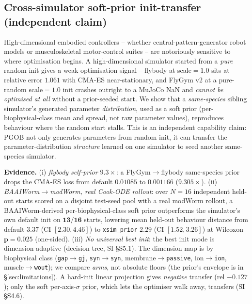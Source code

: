 \documentclass[11pt]{article}
\begin{document}
\subsection{Cross-simulator soft-prior init-transfer (independent claim)}
\label{sec:init_transfer}

High-dimensional embodied controllers -- whether central-pattern-generator robot models \citep{ijspeert2007salamander} or musculoskeletal motor-control suites \citep{caggiano2022myosuite} -- are notoriously sensitive to where optimisation begins. A high-dimensional simulator started from a \emph{pure} random init gives a weak optimisation signal -- flybody at scale${=}1.0$ sits at relative error $1.061$ with CMA-ES near-stationary, and FlyGym v2 at a pure-random scale${=}1.0$ init crashes outright to a MuJoCo NaN and \emph{cannot be optimised at all} without a prior-seeded start. We show that a \emph{same-species} sibling simulator's generated parameter \emph{distribution}, used as a soft prior (per-biophysical-class mean and spread, not raw parameter values), reproduces behaviour where the random start stalls. This is an independent capability claim: PGOB not only generates parameters from random init, it can transfer the parameter-distribution \emph{structure} learned on one simulator to seed another same-species simulator.

\textbf{Evidence.} (i) \emph{flybody self-prior $9.3\times$}: a FlyGym$\to$flybody same-species prior drops the CMA-ES loss from default $0.01085$ to $0.001166$ ($9.305\times$). (ii) \emph{BAAIWorm$\to$modWorm, real Cook-ODE rollout}: over $N{=}16$ independent held-out starts scored on a disjoint test-seed pool with a real modWorm rollout, a BAAIWorm-derived per-biophysical-class soft prior outperforms the simulator's own default init on $\mathbf{13/16}$ starts, lowering mean held-out behaviour distance from default $\mathbf{3.37}$ (CI $[2.30,4.46]$) to \texttt{xsim\_prior} $\mathbf{2.29}$ (CI $[1.52,3.26]$) at Wilcoxon $\mathbf{p{=}0.025}$ (one-sided). (iii) \emph{No universal best init}: the best init mode is dimension-adaptive (decision tree, SI \S S5.1). The dimension map is by biophysical class (\texttt{gap}$\to$\texttt{gj}, \texttt{syn}$\to$\texttt{syn}, membrane$\to$\texttt{passive}, ion$\to$\texttt{ion}, muscle$\to$\texttt{wout}); we compare \emph{arms}, not absolute floors (the prior's envelope is in \S\ref{sec:limitations}). A hard-init linear projection gives \emph{negative} transfer (rel $-0.127$); only the soft per-axis-$\sigma$ prior, which lets the optimiser walk away, transfers (SI \S S4.6).
\end{document}
